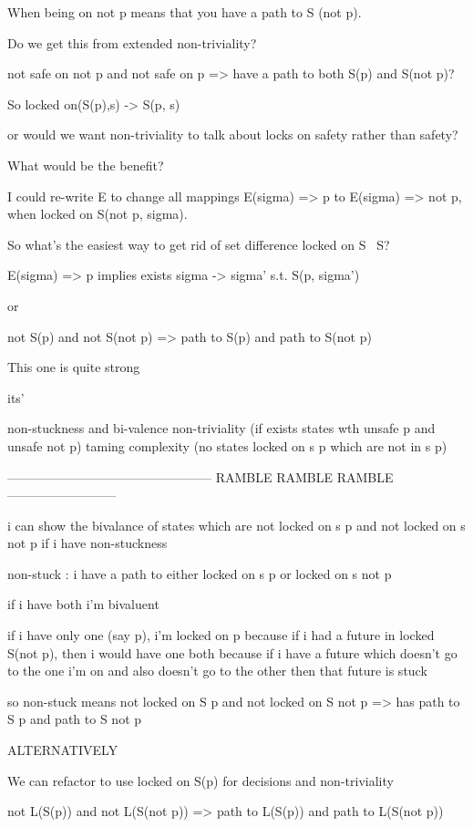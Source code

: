 \documentclass{article}
\theoremstyle{definition}
\begin{document}
When being on not p means that you have a path to S (not p).

Do we get this from extended non-triviality?

not safe on not p and not safe on p => have a path to both S(p) and S(not p)?

So locked on(S(p),s) -> S(p, s)

or would we want non-triviality to talk about locks on safety rather than safety?

What would be the benefit?

I could re-write E to change all mappings E(sigma) => p to E(sigma) => not p, when locked on S(not p, sigma).

So what's the easiest way to get rid of set difference locked on S \ S?

E(sigma) => p implies exists sigma -> sigma' s.t. S(p, sigma')

or

not S(p) and not S(not p) => path to S(p) and path to S(not p)

This one is quite strong

its'

non-stuckness and bi-valence
non-triviality (if exists states wth unsafe p and unsafe not p)
taming complexity (no states locked on s p which are not in s p)

------------------------------------------------ RAMBLE RAMBLE RAMBLE --------------------------

i can show the bivalance of states which are not locked on s p and not locked on s not p if i have non-stuckness


non-stuck : i have a path to either locked on s p or locked on s not p

if i have both i'm bivaluent

if i have only one (say p), i'm locked on p
  because if i had a future in locked S(not p), then i would have one both
  because if i have a future which doesn't go to the one i'm on and also doesn't go to the other
  then that future is stuck


so non-stuck means not locked on S p and not locked on S not p => has path to S p and path to S not p





ALTERNATIVELY



We can refactor to use locked on S(p) for decisions and non-triviality

not L(S(p)) and not L(S(not p)) => path to L(S(p)) and path to L(S(not p))
\end{document}
